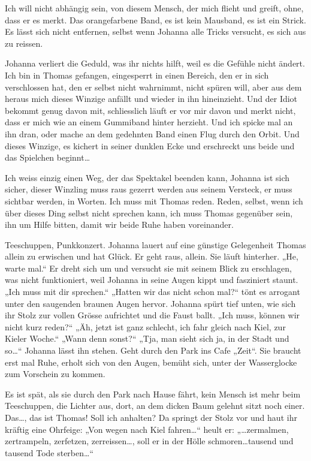 \documentclass[10pt,a5paper]{book}
\begin{document}
Ich will nicht abhängig sein, von diesem Mensch, der mich flieht und greift, ohne, dass er es merkt. Das orangefarbene Band, es ist kein Mausband, es ist ein Strick. Es lässt sich nicht entfernen, selbst wenn Johanna alle Tricks versucht, es sich aus zu reissen. 

Johanna verliert die Geduld, was ihr nichts hilft, weil es die Gefühle nicht ändert. Ich bin in Thomas gefangen, eingesperrt in einen Bereich, den er in sich verschlossen hat, den er selbst nicht wahrnimmt, nicht spüren will, aber aus dem heraus mich dieses Winzige anfällt und wieder in ihn hineinzieht. Und der Idiot bekommt genug davon mit, schliesslich läuft er vor mir davon und merkt nicht, dass er mich wie an einem Gummiband hinter herzieht. Und ich spicke mal an ihn dran, oder mache an dem gedehnten Band einen Flug durch den Orbit. Und dieses Winzige, es kichert in seiner dunklen Ecke und erschreckt uns beide und das Spielchen beginnt\dots 

Ich weiss einzig einen Weg, der das Spektakel beenden kann, Johanna ist sich sicher, dieser Winzling muss raus gezerrt werden aus seinem Versteck, er muss sichtbar werden, in Worten. Ich muss mit Thomas reden. Reden, selbst, wenn ich über dieses Ding selbst nicht sprechen kann, ich muss Thomas gegenüber sein, ihn um Hilfe bitten, damit wir beide Ruhe haben voreinander.

Teeschuppen, Punkkonzert. Johanna lauert auf eine günstige Gelegenheit Thomas allein zu erwischen und hat Glück. Er geht raus, allein. Sie läuft hinterher. „He, warte mal.“ Er dreht sich um und versucht sie mit seinem Blick zu erschlagen, was nicht funktioniert, weil Johanna in seine Augen kippt und fasziniert staunt. „Ich muss mit dir sprechen.“ „Hatten wir das nicht schon mal?“ tönt es arrogant unter den saugenden braunen Augen hervor. Johanna spürt tief unten, wie sich ihr Stolz zur vollen Grösse aufrichtet und die Faust ballt. „Ich muss, können wir nicht kurz reden?“ „Äh, jetzt ist ganz schlecht, ich fahr gleich nach Kiel, zur Kieler Woche.“ „Wann denn sonst?“ „Tja, man sieht sich ja, in der Stadt und so\dots “ Johanna lässt ihn stehen. Geht durch den Park ins Cafe „Zeit“. Sie braucht erst mal Ruhe, erholt sich von den Augen, bemüht sich, unter der Wasserglocke zum Vorschein zu kommen.

Es ist spät, als sie durch den Park nach Hause fährt, kein Mensch ist mehr beim Teeschuppen, die Lichter aus, dort, an dem dicken Baum gelehnt sitzt noch einer. Das\dots , das ist Thomas!  Soll ich anhalten? Da springt der Stolz vor und haut ihr kräftig eine Ohrfeige: „Von wegen nach Kiel fahren\dots “ heult er: „\dots  zermalmen, zertrampeln, zerfetzen, zerreissen\dots , soll er in der Hölle schmoren\dots  tausend und tausend Tode sterben\dots “
\end{document}
